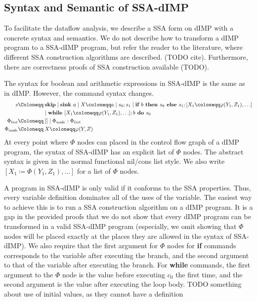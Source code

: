 \subsection{Syntax and Semantic of SSA-dIMP}
To facilitate the dataflow analysis, we describe a SSA form on dIMP with a concrete
syntax and semantics.
We do not describe how to transform a dIMP program to a SSA-dIMP program, but 
refer the reader to the literature, where different SSA construction algorithms are
described. (TODO cite). Furthermore, there are correctness proofs of SSA construction
available (TODO).

The syntax for boolean and arithmetic expressions in SSA-dIMP is the same as in dIMP.
However, the command syntax changes.
\begin{align*}
    s \Coloneqq &\:\skipcmd \mid \defaultsink \mid \defaultstore \mid \defaultssaseq 
    \mid \defaultssaif\\
    &\mid \defaultssawhile \\
    \philist \Coloneqq &\:[] \mid \Phi_{node} : \philist\\
    \Phi_{node} \Coloneqq &\:X \coloneqq \varphi(Y, Z)
\end{align*}
At every point where $\Phi$ nodes can placed in the control flow graph
of a dIMP program, the syntax of SSA-dIMP has an explicit list of $\Phi$ nodes.
The abstract syntax is given in the normal functional nil/cons list style.
We also write $[X_1 \coloneqq \Phi(Y_1, Z_1), \ldots]$
for a list of $\Phi$ nodes.

A program in SSA-dIMP is only valid if it conforms to the SSA properties.
Thus, every variable definition dominates all of the uses of the variable.
The easiest way to achieve this is to run a SSA construction algorithm on a dIMP program.
It is a gap in the provided proofs that we do not show that every dIMP program
can be transformed in a valid SSA-dIMP program (especially, we omit showing that
$\Phi$ nodes will be placed exactly at the places they are allowed in the syntax
of SSA-dIMP).
We also require that the first argument for $\Phi$ nodes for \textbf{if} commands
corresponds to the variable after executing the \btrue{} branch, and the second argument to that
of the variable after executing the \bfalse{} branch.
For \textbf{while} commands, the first argument to the $\Phi$ node is the value
before executing $c_0$ the first time, and the second argument is the value 
after executing the loop body.
TODO something about use of initial values, as they cannot have a definition


